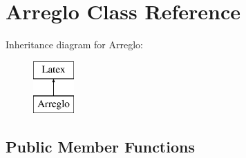 \hypertarget{class_arreglo}{\section{Arreglo Class Reference}
\label{class_arreglo}
}
Inheritance diagram for Arreglo\-:\begin{figure}[H]
\begin{center}
\leavevmode
\includegraphics[height=2.000000cm]{class_arreglo}
\end{center}
\end{figure}
\subsection*{Public Member Functions}
